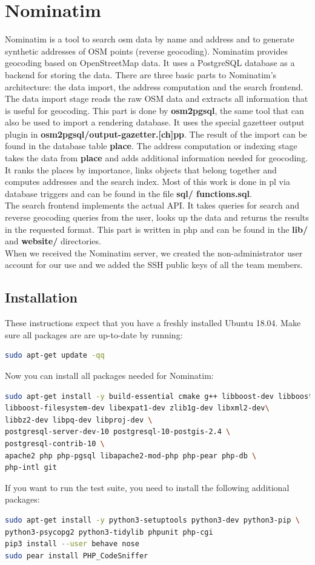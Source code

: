 
\section{Nominatim}
Nominatim is a tool to search \ac{osm} data by name and address and to generate
synthetic addresses of OSM points (reverse geocoding).
Nominatim provides geocoding based on OpenStreetMap data. It uses a PostgreSQL
database as a backend for storing the data.
There are three basic parts to Nominatim's architecture: the data import, the address
computation and the search frontend.
The data import stage reads the raw OSM data and extracts all information that is useful
for geocoding. This part is done by \textbf{osm2pgsql}, the same tool that can also be used to
import a rendering database. It uses the special gazetteer output plugin in \textbf{osm2pgsql/output-gazetter.[ch]pp}. The result of the import can be found in the database table \textbf{place}.
The address computation or indexing stage takes the data from \textbf{place} and adds
additional information needed for geocoding. It ranks the places by importance, links
objects that belong together and computes addresses and the search index. Most of
this work is done in \ac{pl} via database triggers and can be found in the file \textbf{sql/
functions.sql}.\\
The search frontend implements the actual API. It takes queries for search and reverse
geocoding queries from the user, looks up the data and returns the results in the requested
format. This part is written in php and can be found in the \textbf{lib/} and \textbf{website/} directories.\\
When we received the Nominatim server, we created the non-administrator user account for our use and we added the SSH public keys of all the team members.
\subsection{Installation}
These instructions expect that you have a freshly installed Ubuntu 18.04.
Make sure all packages are are up-to-date by running:
\begin{lstlisting}[language=bash,breaklines=true]
sudo apt-get update -qq
\end{lstlisting}
Now you can install all packages needed for Nominatim:
\begin{lstlisting}[language=bash,breaklines=true]
sudo apt-get install -y build-essential cmake g++ libboost-dev libboost-system-dev \
libboost-filesystem-dev libexpat1-dev zlib1g-dev libxml2-dev\
libbz2-dev libpq-dev libproj-dev \
postgresql-server-dev-10 postgresql-10-postgis-2.4 \
postgresql-contrib-10 \
apache2 php php-pgsql libapache2-mod-php php-pear php-db \
php-intl git
\end{lstlisting}
If you want to run the test suite, you need to install the following additional packages:
\begin{lstlisting}[language=bash,breaklines=true]
sudo apt-get install -y python3-setuptools python3-dev python3-pip \
python3-psycopg2 python3-tidylib phpunit php-cgi
pip3 install --user behave nose
sudo pear install PHP_CodeSniffer
\end{lstlisting}
